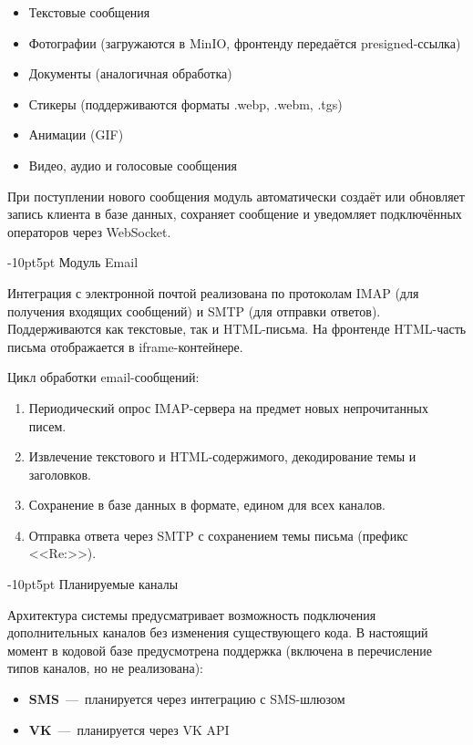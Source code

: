 \documentclass[12pt,a4paper]{report}
\makeatletter
\renewcommand{\subsection}{%
  \@startsection{subsection}{2}{\z@}%
  {-10pt}{5pt}%
  {\normalfont\bfseries\large}}
\makeatother
\begin{document}
\begin{itemize}
    \item Текстовые сообщения
    \item Фотографии (загружаются в MinIO, фронтенду передаётся presigned-ссылка)
    \item Документы (аналогичная обработка)
    \item Стикеры (поддерживаются форматы .webp, .webm, .tgs)
    \item Анимации (GIF)
    \item Видео, аудио и голосовые сообщения
\end{itemize}

При поступлении нового сообщения модуль автоматически создаёт или обновляет запись клиента в базе данных, сохраняет сообщение и уведомляет подключённых операторов через WebSocket.

\subsection{Модуль Email}

Интеграция с электронной почтой реализована по протоколам IMAP (для получения входящих сообщений) и SMTP (для отправки ответов). Поддерживаются как текстовые, так и HTML-письма. На фронтенде HTML-часть письма отображается в iframe-контейнере.

Цикл обработки email-сообщений:
\begin{enumerate}
    \item Периодический опрос IMAP-сервера на предмет новых непрочитанных писем.
    \item Извлечение текстового и HTML-содержимого, декодирование темы и заголовков.
    \item Сохранение в базе данных в формате, едином для всех каналов.
    \item Отправка ответа через SMTP с сохранением темы письма (префикс <<Re:>>).
\end{enumerate}

\subsection{Планируемые каналы}

Архитектура системы предусматривает возможность подключения дополнительных каналов без изменения существующего кода. В настоящий момент в кодовой базе предусмотрена поддержка (включена в перечисление типов каналов, но не реализована):

\begin{itemize}
    \item \textbf{SMS}~---~планируется через интеграцию с SMS-шлюзом
    \item \textbf{VK}~---~планируется через VK API
\end{itemize}
\end{document}
